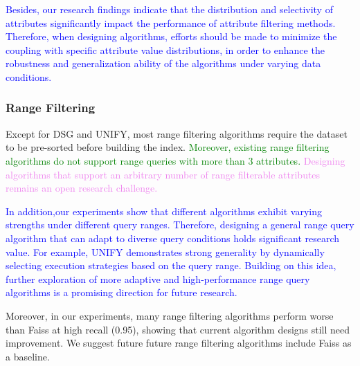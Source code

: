 \documentclass[sigconf, nonacm]{acmart}
\begin{document}
{		
	\textcolor{blue}{
	Besides, our research findings indicate that the distribution and selectivity of attributes significantly impact the performance of attribute filtering methods. Therefore, when designing algorithms, efforts should be made to minimize the coupling with specific attribute value distributions, in order to enhance the robustness and generalization ability of the algorithms under varying data conditions.}
	
	
	\subsubsection{Range Filtering}
	Except for DSG and UNIFY, most range filtering algorithms require the dataset to be pre-sorted before building the index. \textcolor{green}{Moreover, existing range filtering algorithms do not support range queries with more than 3 attributes.} \textcolor{violet}{Designing algorithms that support an arbitrary number of range filterable attributes remains an open research challenge.}
	

\textcolor{blue}{
In addition,our experiments show that different algorithms exhibit varying strengths under different query ranges. Therefore, designing a general range query algorithm that can adapt to diverse query conditions holds significant research value. For example, UNIFY demonstrates strong generality by dynamically selecting execution strategies based on the query range. Building on this idea, further exploration of more adaptive and high-performance range query algorithms is a promising direction for future research.}
	
Moreover, in our experiments, many range filtering algorithms perform worse than Faiss at high recall (0.95), showing that current algorithm designs still need improvement. We suggest future future range filtering algorithms include Faiss as a baseline.
	
}
\end{document}
